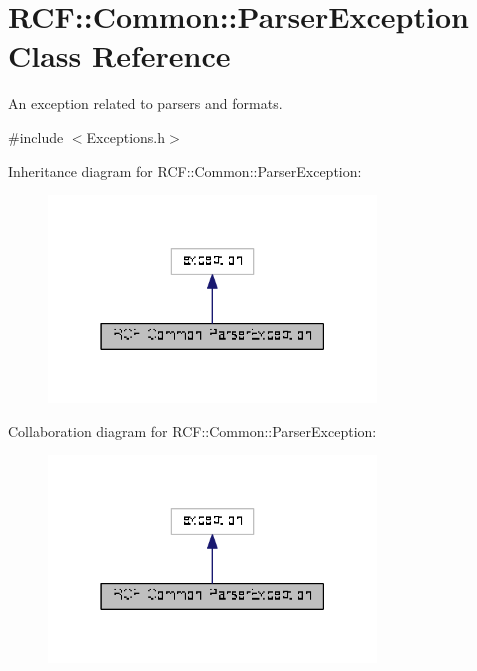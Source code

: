 \hypertarget{class_r_c_f_1_1_common_1_1_parser_exception}{}\section{R\+C\+F\+:\+:Common\+:\+:Parser\+Exception Class Reference}
\label{class_r_c_f_1_1_common_1_1_parser_exception}


An exception related to parsers and formats.  




{\ttfamily \#include $<$Exceptions.\+h$>$}



Inheritance diagram for R\+C\+F\+:\+:Common\+:\+:Parser\+Exception\+:\nopagebreak
\begin{figure}[H]
\begin{center}
\leavevmode
\includegraphics[width=247pt]{class_r_c_f_1_1_common_1_1_parser_exception__inherit__graph}
\end{center}
\end{figure}


Collaboration diagram for R\+C\+F\+:\+:Common\+:\+:Parser\+Exception\+:\nopagebreak
\begin{figure}[H]
\begin{center}
\leavevmode
\includegraphics[width=247pt]{class_r_c_f_1_1_common_1_1_parser_exception__coll__graph}
\end{center}
\end{figure}
